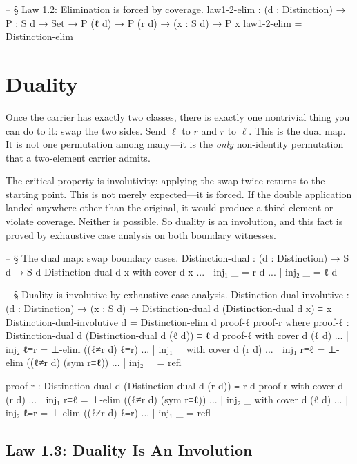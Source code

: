 \documentclass[11pt,a4paper]{book}
\begin{document}
\begin{code}
-- § Law 1.2: Elimination is forced by coverage.
law1-2-elim :
  (d : Distinction) →
  {P : S d → Set} →
  P (ℓ d) →
  P (r d) →
  (x : S d) →
  P x
law1-2-elim = Distinction-elim
\end{code}

\section{Duality}

Once the carrier has exactly two classes, there is exactly one nontrivial thing you can do to it: swap the two sides. Send $\ell$ to $r$ and $r$ to $\ell$. This is the dual map. It is not one permutation among many—it is the \textit{only} non-identity permutation that a two-element carrier admits.

The critical property is involutivity: applying the swap twice returns to the starting point. This is not merely expected—it is forced. If the double application landed anywhere other than the original, it would produce a third element or violate coverage. Neither is possible. So duality is an involution, and this fact is proved by exhaustive case analysis on both boundary witnesses.

\begin{code}
-- § The dual map: swap boundary cases.
Distinction-dual : (d : Distinction) → S d → S d
Distinction-dual d x with cover d x
... | inj₁ _ = r d
... | inj₂ _ = ℓ d

-- § Duality is involutive by exhaustive case analysis.
Distinction-dual-involutive :
  (d : Distinction) →
  (x : S d) →
  Distinction-dual d (Distinction-dual d x) ≡ x
Distinction-dual-involutive d =
  Distinction-elim d proof-ℓ proof-r
  where
    proof-ℓ : Distinction-dual d (Distinction-dual d (ℓ d)) ≡ ℓ d
    proof-ℓ with cover d (ℓ d)
    ... | inj₂ ℓ≡r = ⊥-elim ((ℓ≠r d) ℓ≡r)
    ... | inj₁ _ with cover d (r d)
    ... | inj₁ r≡ℓ = ⊥-elim ((ℓ≠r d) (sym r≡ℓ))
    ... | inj₂ _   = refl

    proof-r : Distinction-dual d (Distinction-dual d (r d)) ≡ r d
    proof-r with cover d (r d)
    ... | inj₁ r≡ℓ = ⊥-elim ((ℓ≠r d) (sym r≡ℓ))
    ... | inj₂ _ with cover d (ℓ d)
    ... | inj₂ ℓ≡r = ⊥-elim ((ℓ≠r d) ℓ≡r)
    ... | inj₁ _   = refl
\end{code}

\subsection{Law 1.3: Duality Is An Involution}
\end{document}
